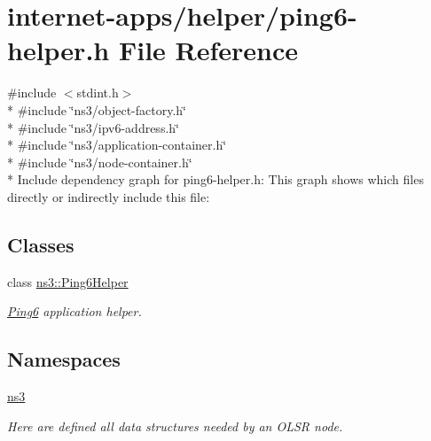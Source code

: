 \hypertarget{ping6-helper_8h}{}\section{internet-\/apps/helper/ping6-\/helper.h File Reference}
\label{ping6-helper_8h}
{\ttfamily \#include $<$stdint.\+h$>$}\\*
{\ttfamily \#include \char`\"{}ns3/object-\/factory.\+h\char`\"{}}\\*
{\ttfamily \#include \char`\"{}ns3/ipv6-\/address.\+h\char`\"{}}\\*
{\ttfamily \#include \char`\"{}ns3/application-\/container.\+h\char`\"{}}\\*
{\ttfamily \#include \char`\"{}ns3/node-\/container.\+h\char`\"{}}\\*
Include dependency graph for ping6-\/helper.h\+:
This graph shows which files directly or indirectly include this file\+:
\subsection*{Classes}
\begin{DoxyCompactItemize}
\item 
class \hyperlink{classns3_1_1Ping6Helper}{ns3\+::\+Ping6\+Helper}
\begin{DoxyCompactList}\small\item\em \hyperlink{classns3_1_1Ping6}{Ping6} application helper. \end{DoxyCompactList}\end{DoxyCompactItemize}
\subsection*{Namespaces}
\begin{DoxyCompactItemize}
\item 
 \hyperlink{namespacens3}{ns3}
\begin{DoxyCompactList}\small\item\em Here are defined all data structures needed by an O\+L\+SR node. \end{DoxyCompactList}\end{DoxyCompactItemize}
